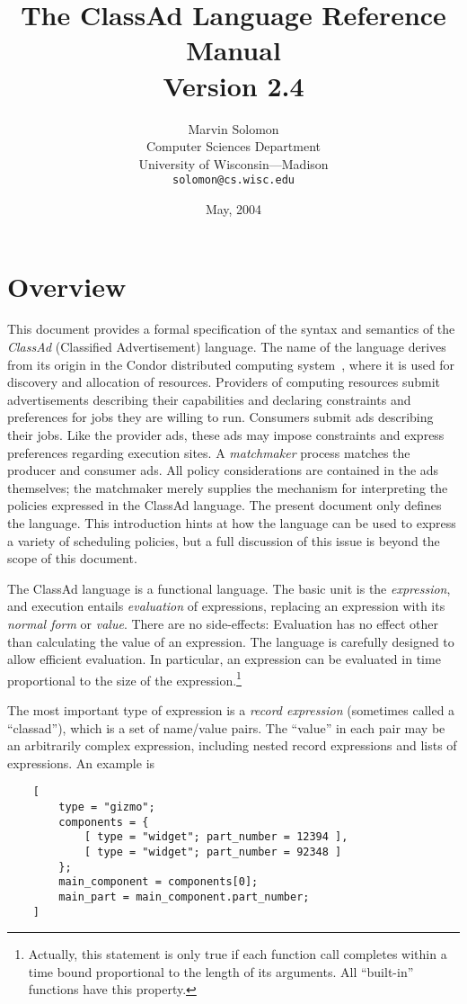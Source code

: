 \documentclass{article}
\title{The ClassAd Language Reference Manual\\Version 2.4}
\author{Marvin Solomon\\Computer Sciences Department\\University of
Wisconsin---Madison\\\texttt{solomon@cs.wisc.edu}}
\date{May, 2004}
\begin{document}
\maketitle
\section{Overview}

This document provides a formal specification of the syntax and
semantics of the \emph{ClassAd} (Classified Advertisement) language.
The name of the language derives from its origin in the Condor distributed
computing system~\cite{CONDOR_EXP,CONDOR_HUNT}, where it is used for discovery
and allocation of resources.  Providers of computing resources submit
advertisements describing their capabilities and declaring constraints and
preferences for jobs they are willing to run.  Consumers submit ads
describing their jobs.  Like the provider ads, these ads may impose constraints
and express preferences regarding execution sites.  A \emph{matchmaker} process
matches the producer and consumer ads.  All policy considerations are contained
in the ads themselves; the matchmaker merely supplies the mechanism for
interpreting the policies expressed in the ClassAd language.  The present
document only defines the language. This introduction hints at how the language
can be used to express a variety of scheduling policies, but a full discussion
of this issue is beyond the scope of this document.

The ClassAd language is a functional language.  The basic unit is the
\emph{expression}, and execution entails \emph{evaluation} of expressions,
replacing an expression with its \emph{normal form} or \emph{value}.  There are
no side-effects: Evaluation has no effect other than calculating the value of
an expression.
The language is carefully designed to allow efficient evaluation.  In
particular, an expression can be evaluated in time proportional to the size of
the expression.\footnote{Actually, this statement is only true if
each function call completes within a time bound proportional to the length
of its arguments.
All ``built-in'' functions have this property.}

The most important type of expression is a \emph{record expression} (sometimes
called a ``classad''), which is a set of name/value pairs.  The ``value'' in
each pair may be an arbitrarily complex expression, including nested record
expressions and lists of expressions.  An example is
\begin{verbatim}
    [
        type = "gizmo";
        components = {
            [ type = "widget"; part_number = 12394 ],
            [ type = "widget"; part_number = 92348 ]
        };
        main_component = components[0];
        main_part = main_component.part_number;
    ]
\end{verbatim}
\end{document}
